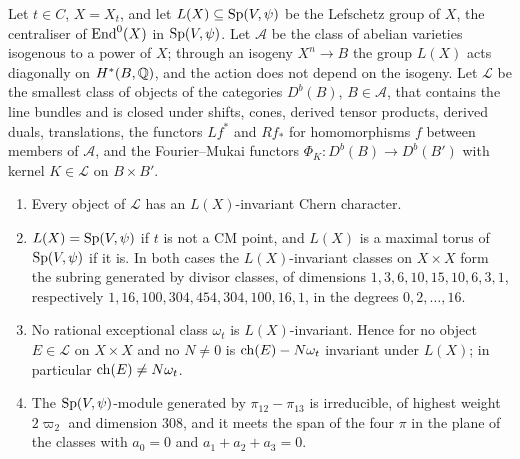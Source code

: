 \begin{theorem}\label{thm:lefschetzclosure}
Let $t\in C$, $X=X_{t}$, and let $L(X)\subseteq\operatorname{Sp}(V,\psi)$ be the Lefschetz
group of $X$, the centraliser of $\operatorname{End}^{0}(X)$ in $\operatorname{Sp}(V,\psi)$. Let
$\mathcal{A}$ be the class of abelian varieties isogenous to a power of $X$;
through an isogeny $X^{n}\to B$ the group $L(X)$ acts diagonally on
$H^{*}(B,\mathbb{Q})$, and the action does not depend on the isogeny. Let
$\mathcal{L}$ be the smallest class of objects of the categories
$D^{b}(B)$, $B\in\mathcal{A}$, that contains the line bundles and is closed
under shifts, cones, derived tensor products, derived duals, translations,
the functors $Lf^{*}$ and $Rf_{*}$ for homomorphisms $f$ between members of
$\mathcal{A}$, and the Fourier--Mukai functors $\Phi_{K}\colon D^{b}(B)\to
D^{b}(B')$ with kernel $K\in\mathcal{L}$ on $B\times B'$.
\begin{enumerate}[label=\textup{(\roman*)},leftmargin=2.6em,itemsep=2pt]
\item Every object of $\mathcal{L}$ has an $L(X)$-invariant Chern character.
\item $L(X)=\operatorname{Sp}(V,\psi)$ if $t$ is not a CM point, and $L(X)$ is a maximal
  torus of $\operatorname{Sp}(V,\psi)$ if it is. In both cases the $L(X)$-invariant classes
  on $X\times X$ form the subring generated by divisor classes, of dimensions
  $1,3,6,10,15,10,6,3,1$, respectively $1,16,100,304,454,304,100,16,1$, in
  the degrees $0,2,\dots,16$.
\item No rational exceptional class $\omega_{t}$ is $L(X)$-invariant. Hence
  for no object $E\in\mathcal{L}$ on $X\times X$ and no $N\ne0$ is
  $\operatorname{ch}(E)-N\omega_{t}$ invariant under $L(X)$; in particular
  $\operatorname{ch}(E)\ne N\omega_{t}$.
\item The $\operatorname{Sp}(V,\psi)$-module generated by $\pi_{12}-\pi_{13}$ is
  irreducible, of highest weight $2\varpi_{2}$ and dimension $308$, and it
  meets the span of the four $\pi$ in the plane of the classes with
  $a_{0}=0$ and $a_{1}+a_{2}+a_{3}=0$.
\end{enumerate}
\end{theorem}

